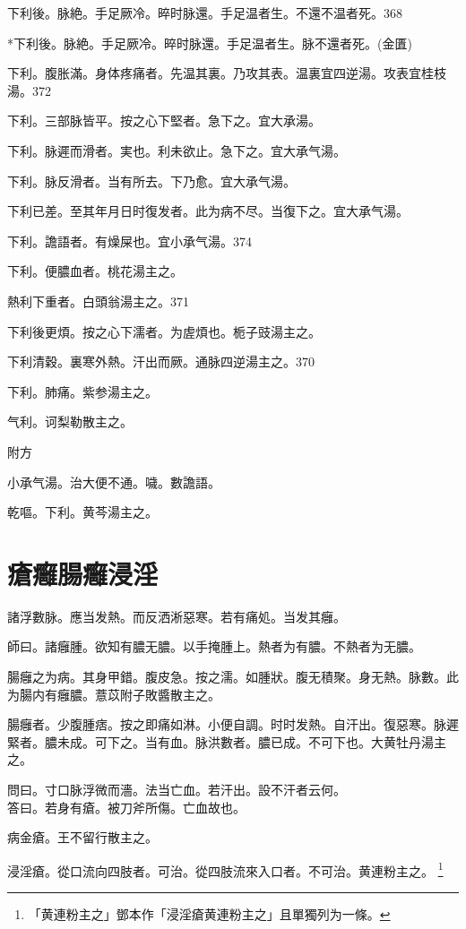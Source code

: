 \documentclass[12pt,twoside,UTF8,b5paper]{ctexbook}
\begin{document}
下利後。脉絶。手足厥{冷}。晬时脉還。手足温者生。不還{不温}者死。368

*下利後。脉絶。手足厥冷。晬时脉還。手足温者生。脉不還者死。(金匱)

下利。腹胀滿。身体疼痛者。先温其裏。乃攻其表。温裏宜四逆湯。攻表宜桂枝湯。372

下利。三部脉皆平。按之心下堅者。急下之。宜大承湯。

下利。脉遲而滑者。実也。利未欲止。急下之。宜大承气湯。

下利。脉反滑者。当有所去。下乃愈。宜大承气湯。

下利已差。至其{年月日}时復发者。此为病不尽。当{復}下之。宜{大}承气湯。

下利。譫語者。有燥屎也。宜{小}承气湯。374

下利。便膿血者。桃花湯主之。

熱利下重者。白頭翁湯主之。371

下利後更煩。按之心下濡者。为虗煩也。栀子豉湯主之。

下利清穀。裏寒外熱。汗出而厥。通脉四逆湯主之。370

下利。肺痛。紫参湯主之。

气利。诃梨勒散主之。

附方

小承气湯。治大便不通。噦。數譫語。

乾嘔。下利。黄芩湯主之。

\chapter{瘡癰腸癰浸淫}

諸浮數脉。應当发熱。而反洒淅惡寒。若有痛処。当发其癰。

師曰。諸癰腫。欲知有膿无膿。以手掩腫上。熱者为有膿。不熱者为无膿。

腸癰之为病。其身甲錯。腹皮急。按之濡。如腫狀。腹无積聚。身无熱。脉數。此为腸内有癰膿。薏苡附子敗醬散主之。

腸癰者。少腹腫痞。按之即痛如淋。小便自調。时时发熱。自汗出。復惡寒。脉遲緊者。膿未成。可下之。当有血。脉洪數者。膿已成。不可下也。大黄牡丹湯主之。

問曰。寸口脉浮微而濇。法当亡血。若汗出。設不汗者云何。\\
答曰。若身有瘡。被刀斧所傷。亡血故也。

病金瘡。王不留行散主之。

浸淫瘡。從口流向四肢者。可治。從四肢流來入口者。不可治。黄連粉主之。
	\footnote{「黄連粉主之」鄧本作「浸淫瘡黄連粉主之」且單獨列为一條。}
\end{document}
